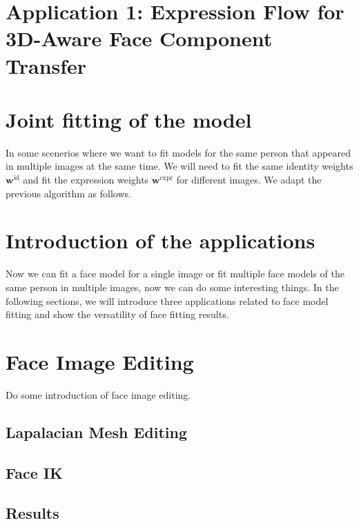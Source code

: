 \section{Application 1: Expression Flow for 3D-Aware Face
Component Transfer}

\section{Joint fitting of the model}
In some scenerios where we want to fit models for the same person that appeared in multiple images at the same time. We will need to fit the same identity weights $\mathbf{w}^{\text{id}}$ and fit the expression weights $\mathbf{w}^{\text{expr}}$ for different images. We adapt the previous algorithm as follows.

\section{Introduction of the applications}
Now we can fit a face model for a single image or fit multiple face models of the same person in multiple images, now we can do some interesting things. In the following sections, we will introduce three applications related to face model fitting and show the versatility of face fitting results.

\section{Face Image Editing}
Do some introduction of face image editing.
\subsection{Lapalacian Mesh Editing}

\subsection{Face IK}

\subsection{Results}



